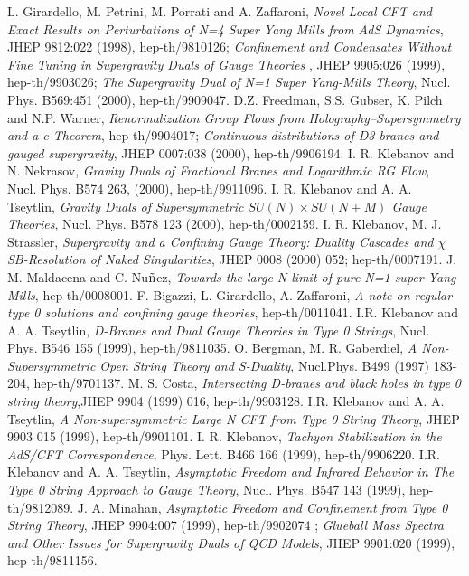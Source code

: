 \documentclass[a4paper,12pt]{article}
\begin{document}
\begin{thebibliography}{99}

L. Girardello, M. Petrini, M. Porrati and A. Zaffaroni, {\it Novel Local CFT and Exact Results on Perturbations of N=4 Super Yang Mills from AdS Dynamics}, JHEP 9812:022 (1998), 
hep-th/9810126; {\it  Confinement and Condensates Without Fine Tuning in Supergravity Duals of Gauge Theories }, JHEP 9905:026 (1999), hep-th/9903026; {\it The Supergravity Dual of N=1 Super Yang-Mills Theory}, 
Nucl. Phys. B569:451 (2000), hep-th/9909047. 
D.Z. Freedman, S.S. Gubser, K. Pilch and N.P. Warner, {\it Renormalization Group Flows from Holography--Supersymmetry and a c-Theorem}, hep-th/9904017; {\it Continuous distributions of D3-branes and gauged supergravity}, JHEP 0007:038 (2000), hep-th/9906194.
 I. R. Klebanov and N. Nekrasov, {\it Gravity Duals of Fractional Branes and Logarithmic RG Flow}, Nucl. Phys. B574 263, (2000), hep-th/9911096.
I. R. Klebanov and A. A. Tseytlin, {\it Gravity Duals of Supersymmetric $SU(N)\times SU(N+M)$ Gauge Theories}, Nucl. Phys. B578 123 (2000), hep-th/0002159.  
I. R. Klebanov, M. J. Strassler, {\it Supergravity and a Confining Gauge Theory: Duality Cascades and $\chi$SB-Resolution of Naked Singularities}, JHEP 0008 (2000) 052; hep-th/0007191. 
J. M. Maldacena and C. Nu$\tilde{\mbox n}$ez, {\it Towards the large N limit of pure N=1 super Yang Mills}, hep-th/0008001.
 F. Bigazzi, L. Girardello, A. Zaffaroni, {\it A note on regular type 0 solutions and confining gauge theories}, hep-th/0011041.
 I.R. Klebanov and A. A. Tseytlin, {\it D-Branes and Dual Gauge Theories 
in Type 0 Strings}, Nucl. Phys. B546 155 (1999), hep-th/9811035.
O. Bergman, M. R. Gaberdiel, {\it A Non-Supersymmetric Open String Theory and S-Duality}, Nucl.Phys. B499 (1997) 183-204, hep-th/9701137.
 M. S. Costa, {\it Intersecting D-branes and black holes in type 0 string theory},JHEP 9904 (1999) 016, hep-th/9903128.
 I.R. Klebanov and A. A. Tseytlin, {\it A Non-supersymmetric Large N CFT from Type 0 String Theory}, JHEP 9903 015 (1999), hep-th/9901101.
I. R. Klebanov, {\it Tachyon Stabilization in the AdS/CFT Correspondence}, Phys. Lett. B466 166 (1999), hep-th/9906220.
 I.R. Klebanov and A. A. Tseytlin, {\it Asymptotic Freedom and Infrared Behavior in The Type 0 String Approach to Gauge Theory}, Nucl. Phys. B547 143 (1999), hep-th/9812089.
 J. A. Minahan, {\it Asymptotic Freedom and Confinement from Type 0 String Theory}, JHEP 9904:007 (1999), hep-th/9902074 ; {\it Glueball Mass Spectra and Other Issues for Supergravity Duals of QCD Models}, JHEP 9901:020 (1999), hep-th/9811156. 

\end{thebibliography}
\end{document}

